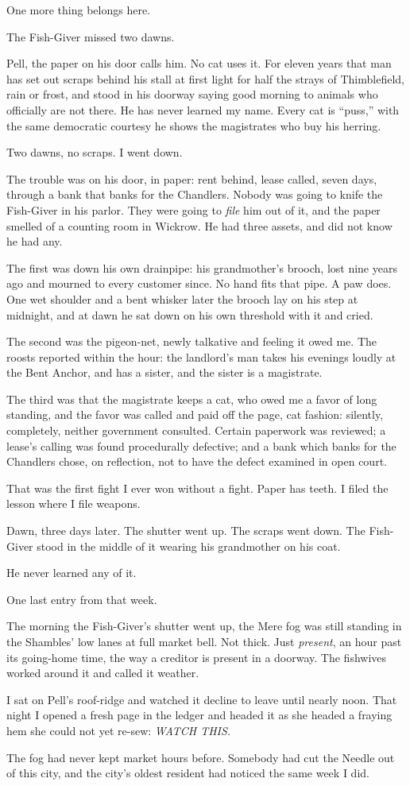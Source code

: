 \scenebreak

One more thing belongs here.

The Fish-Giver missed two dawns.

Pell, the paper on his door calls him. No cat uses it. For eleven years that man has set out scraps behind his stall at first light for half the strays of Thimblefield, rain or frost, and stood in his doorway saying good morning to animals who officially are not there. He has never learned my name. Every cat is ``puss,'' with the same democratic courtesy he shows the magistrates who buy his herring.

Two dawns, no scraps. I went down.

The trouble was on his door, in paper: rent behind, lease called, seven days, through a bank that banks for the Chandlers. Nobody was going to knife the Fish-Giver in his parlor. They were going to \emph{file} him out of it, and the paper smelled of a counting room in Wickrow. He had three assets, and did not know he had any.

The first was down his own drainpipe: his grandmother's brooch, lost nine years ago and mourned to every customer since. No hand fits that pipe. A paw does. One wet shoulder and a bent whisker later the brooch lay on his step at midnight, and at dawn he sat down on his own threshold with it and cried.

The second was the pigeon-net, newly talkative and feeling it owed me. The roosts reported within the hour: the landlord's man takes his evenings loudly at the Bent Anchor, and has a sister, and the sister is a magistrate.

The third was that the magistrate keeps a cat, who owed me a favor of long standing, and the favor was called and paid off the page, cat fashion: silently, completely, neither government consulted. Certain paperwork was reviewed; a lease's calling was found procedurally defective; and a bank which banks for the Chandlers chose, on reflection, not to have the defect examined in open court.

That was the first fight I ever won without a fight. Paper has teeth. I filed the lesson where I file weapons.

Dawn, three days later. The shutter went up. The scraps went down. The Fish-Giver stood in the middle of it wearing his grandmother on his coat.

He never learned any of it.

\scenebreak

One last entry from that week.

The morning the Fish-Giver's shutter went up, the Mere fog was still standing in the Shambles' low lanes at full market bell. Not thick. Just \emph{present}, an hour past its going-home time, the way a creditor is present in a doorway. The fishwives worked around it and called it weather.

I sat on Pell's roof-ridge and watched it decline to leave until nearly noon. That night I opened a fresh page in the ledger and headed it as she headed a fraying hem she could not yet re-sew: \emph{WATCH THIS.}

The fog had never kept market hours before. Somebody had cut the Needle out of this city, and the city's oldest resident had noticed the same week I did.
